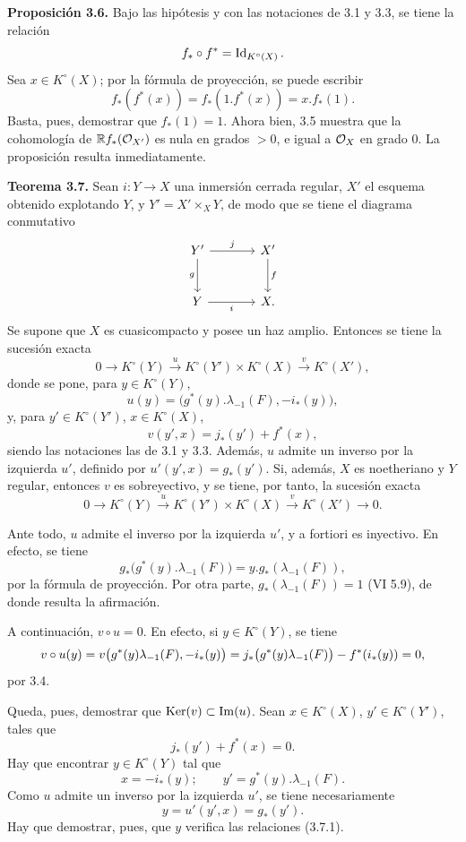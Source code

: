 \textbf{Proposición 3.6.} Bajo las hipótesis y con las notaciones de 3.1 y 3.3, se tiene la relación
\[
f_*\circ f^*=\Id_{K^\circ(X)}.
\]
Sea \(x\in K^\circ(X)\); por la fórmula de proyección, se puede escribir
\[
f_*(f^*(x))=f_*(1.f^*(x))=x.f_*(1).
\]
Basta, pues, demostrar que \(f_*(1)=1\). Ahora bien, 3.5 muestra que la cohomología de \(\mathbb Rf_*(\cO_{X'})\) es nula en grados \(>0\), e igual a \(\cO_X\) en grado \(0\). La proposición resulta inmediatamente.

\textbf{Teorema 3.7.} Sean \(i:Y\to X\) una inmersión cerrada regular, \(X'\) el esquema obtenido explotando \(Y\), y \(Y'=X'\times_XY\), de modo que se tiene el diagrama conmutativo
\[
\begin{tikzcd}[column sep=large,row sep=large]
Y' \arrow[r,"j"] \arrow[d,"g"'] & X' \arrow[d,"f"]\\
Y \arrow[r,"i"'] & X.
\end{tikzcd}
\]
Se supone que \(X\) es cuasicompacto y posee un haz amplio. Entonces se tiene la sucesión exacta
\[
0\longrightarrow K^\circ(Y)\xrightarrow{u}K^\circ(Y')\times K^\circ(X)
\xrightarrow{v}K^\circ(X'),
\]
donde se pone, para \(y\in K^\circ(Y)\),
\[
u(y)=\bigl(g^*(y).\lambda_{-1}(F),-i_*(y)\bigr),
\]
y, para \(y'\in K^\circ(Y')\), \(x\in K^\circ(X)\),
\[
v(y',x)=j_*(y')+f^*(x),
\]
siendo las notaciones las de 3.1 y 3.3. Además, \(u\) admite un inverso por la izquierda \(u'\), definido por \(u'(y',x)=g_*(y')\).
Si, además, \(X\) es noetheriano y \(Y\) regular, entonces \(v\) es sobreyectivo, y se tiene, por tanto, la sucesión exacta
\[
0\longrightarrow K^\circ(Y)\xrightarrow{u}K^\circ(Y')\times K^\circ(X)
\xrightarrow{v}K^\circ(X')\longrightarrow0.
\]

Ante todo, \(u\) admite el inverso por la izquierda \(u'\), y a fortiori es inyectivo. En efecto, se tiene
\[
g_*\bigl(g^*(y).\lambda_{-1}(F)\bigr)
=y.g_*(\lambda_{-1}(F)),
\]
por la fórmula de proyección. Por otra parte, \(g_*(\lambda_{-1}(F))=1\) (VI 5.9), de donde resulta la afirmación.

A continuación, \(v\circ u=0\). En efecto, si \(y\in K^\circ(Y)\), se tiene
\[
v\circ u(y)
=v\bigl(g^*(y)\lambda_{-1}(F),-i_*(y)\bigr)
=j_*\bigl(g^*(y)\lambda_{-1}(F)\bigr)-f^*(i_*(\sisi{x}{y}))=0,
\]
por 3.4.

Queda, pues, demostrar que \(\Ker(v)\subset \Im(u)\). Sean \(x\in K^\circ(X)\), \(y'\in K^\circ(Y')\), tales que
\[
j_*(y')+f^*(x)=0.
\]
Hay que encontrar \(y\in K^\circ(Y)\) tal que
\begin{equation}\tag{3.7.1}
x=-i_*(y);\qquad y'=g^*(y).\lambda_{-1}(F).
\end{equation}
Como \(u\) admite un inverso por la izquierda \(u'\), se tiene necesariamente
\[
y=u'(y',x)=g_*(y').
\]
Hay que demostrar, pues, que \(y\) verifica las relaciones (3.7.1).

